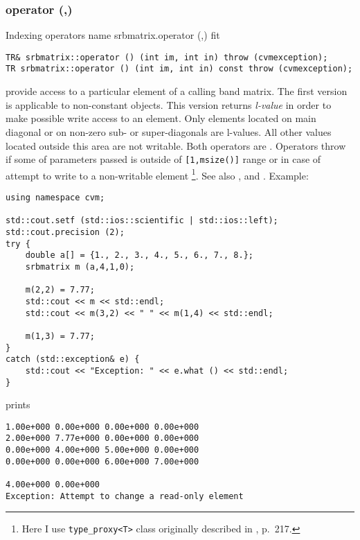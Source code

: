 \subsubsection{operator (,)}
Indexing operators%
\pdfdest name {srbmatrix.operator (,)} fit
\begin{verbatim}
TR& srbmatrix::operator () (int im, int in) throw (cvmexception);
TR srbmatrix::operator () (int im, int in) const throw (cvmexception);
\end{verbatim}
provide access to a particular element of a calling band matrix. The first version
is applicable to non-constant objects.
This version returns  \emph{l-value}
in order to make possible write access to an element.
Only elements located on main diagonal or on non-zero
sub- or super-diagonals are l-values. All other values
located outside this area are not writable.
Both operators are \Based.
Operators throw 
if some of parameters passed
is outside of \verb"[1,msize()]" range or
in case of attempt to write to a non-writable element%
\footnote{Here I use \verb"type_proxy<T>" class originally
described in , p.~217.}.
See also ,
 and
.
Example:
\begin{Verbatim}
using namespace cvm;

std::cout.setf (std::ios::scientific | std::ios::left); 
std::cout.precision (2);
try {
    double a[] = {1., 2., 3., 4., 5., 6., 7., 8.};
    srbmatrix m (a,4,1,0);

    m(2,2) = 7.77;
    std::cout << m << std::endl;
    std::cout << m(3,2) << " " << m(1,4) << std::endl;

    m(1,3) = 7.77;
}
catch (std::exception& e) {
    std::cout << "Exception: " << e.what () << std::endl;
}
\end{Verbatim}
prints
\begin{Verbatim}
1.00e+000 0.00e+000 0.00e+000 0.00e+000
2.00e+000 7.77e+000 0.00e+000 0.00e+000
0.00e+000 4.00e+000 5.00e+000 0.00e+000
0.00e+000 0.00e+000 6.00e+000 7.00e+000

4.00e+000 0.00e+000
Exception: Attempt to change a read-only element
\end{Verbatim}
\newpage



